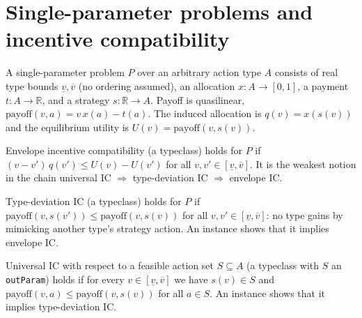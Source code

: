\section{Single-parameter problems and incentive compatibility}

\begin{definition}\label{def:MathEconLib.SingleParameterProblem}\leanok
A single-parameter problem $P$ over an arbitrary action type $A$ consists of real type bounds $\underline v,\overline v$ (no ordering assumed), an allocation $x:A\to[0,1]$, a payment $t:A\to\mathbb{R}$, and a strategy $s:\mathbb{R}\to A$. Payoff is quasilinear, $\mathrm{payoff}(v,a)=v\,x(a)-t(a)$. The induced allocation is $q(v)=x(s(v))$ and the equilibrium utility is $U(v)=\mathrm{payoff}(v,s(v))$.
\end{definition}

\begin{definition}\label{def:MathEconLib.SingleParameterProblem.HasEnvelopeIC}\leanok
{}
Envelope incentive compatibility (a typeclass) holds for $P$ if $(v-v')\,q(v')\le U(v)-U(v')$ for all $v,v'\in[\underline v,\overline v]$. It is the weakest notion in the chain universal IC $\Rightarrow$ type-deviation IC $\Rightarrow$ envelope IC.
\end{definition}

\begin{definition}\label{def:MathEconLib.SingleParameterProblem.HasTypeDeviationIC}\leanok
{}
Type-deviation IC (a typeclass) holds for $P$ if $\mathrm{payoff}(v,s(v'))\le\mathrm{payoff}(v,s(v))$ for all $v,v'\in[\underline v,\overline v]$: no type gains by mimicking another type's strategy action. An instance shows that it implies envelope IC.
\end{definition}

\begin{definition}\label{def:MathEconLib.SingleParameterProblem.HasUniversalIC}\leanok
{}
Universal IC with respect to a feasible action set $S\subseteq A$ (a typeclass with $S$ an \texttt{outParam}) holds if for every $v\in[\underline v,\overline v]$ we have $s(v)\in S$ and $\mathrm{payoff}(v,a)\le\mathrm{payoff}(v,s(v))$ for all $a\in S$. An instance shows that it implies type-deviation IC.
\end{definition}

